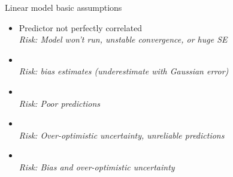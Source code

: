 \documentclass[10pt]{beamer}
\begin{document}
\begin{frame}{Linear model basic assumptions}
 \begin{block}{}
     \begin{itemize}
      \item Predictor not perfectly correlated \\ \textit{Risk: Model won't run, unstable convergence, or huge SE}
       \item {\color{red!20!black}{Little error in predictors}}\\ \textit{Risk: bias estimates (underestimate with Gaussian error)}
       \item {\color{red!50!black}{Gaussian error distribution}}\\ \textit{Risk: Poor predictions}
       \item {\color{red!70!black}{Homoscedasticity (constant error variance)}}\\ \textit{Risk: Over-optimistic uncertainty, unreliable predictions}
       \item {\color{red!99!black}{Independence of error}}\\ \textit{Risk: Bias and over-optimistic uncertainty}
     \end{itemize}
 \end{block}
\end{frame}
\end{document}
